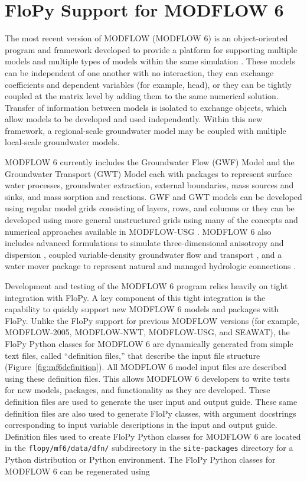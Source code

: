 \documentclass[11pt, oneside]{article}  	%
\begin{document}
\section{FloPy Support for MODFLOW 6}

The most recent version of MODFLOW (MODFLOW 6) is an object-oriented program and framework developed to provide a platform for supporting multiple models and multiple types of models within the same simulation \citep{modflow6framework}. These models can be independent of one another with no interaction, they can exchange coefficients and dependent variables (for example, head), or they can be tightly coupled at the matrix level by adding them to the same numerical solution. Transfer of information between models is isolated to exchange objects, which allow models to be developed and used independently. Within this new framework, a regional-scale groundwater model may be coupled with multiple local-scale groundwater models. 

MODFLOW 6 currently includes the Groundwater Flow (GWF) Model and the Groundwater Transport (GWT) Model each with packages to represent surface water processes, groundwater extraction, external boundaries, mass sources and sinks, and mass sorption and reactions. GWF and GWT models can be developed using regular model grids consisting of layers, rows, and columns or they can be developed using more general unstructured grids using many of the concepts and numerical approaches available in MODFLOW-USG \citep{modflowusg}. MODFLOW 6 also includes advanced formulations to simulate three-dimensional anisotropy and dispersion \citep{modflow6xt3d}, coupled variable-density groundwater flow and transport \citep{langevin2020hydraulic}, and a water mover package to represent natural and managed hydrologic connections \citep{morway2021use}.

Development and testing of the MODFLOW 6 program relies heavily on tight integration with FloPy. A key component of this tight integration is the capability to quickly support new MODFLOW 6 models and packages with FloPy. Unlike the FloPy support for previous MODFLOW versions (for example, MODFLOW-2005, MODFLOW-NWT, MODFLOW-USG, and SEAWAT), the FloPy Python classes for MODFLOW 6 are dynamically generated from simple text files, called  ``definition files,'' that describe the input file structure (Figure~\ref{fig:mf6definition}). All MODFLOW 6 model input files are described using these definition files.  This allows MODFLOW 6 developers to write tests for new models, packages, and functionality as they are developed. These definition files are used to generate the user input and output guide. These same definition files are also used to generate FloPy classes, with argument docstrings corresponding to input variable descriptions in the input and output guide. Definition files used to create FloPy Python classes for MODFLOW 6 are located in the \texttt{flopy/mf6/data/dfn/} subdirectory in the \texttt{site-packages} directory for a Python distribution or Python environment. The FloPy Python classes for MODFLOW 6 can be regenerated using 
\end{document}
